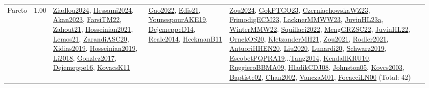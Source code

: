 {\begin{longtable}{p{3cm}r>{\raggedright\arraybackslash}p{6cm}>{\raggedright\arraybackslash}p{6cm}>{\raggedright\arraybackslash}p{8cm}}
\index{Pareto}\index{Concepts!Pareto}Pareto &  1.00 & \hyperref[detail:Ziadlou2024]{Ziadlou2024}, \hyperref[detail:Hessami2024]{Hessami2024}, \hyperref[detail:Akan2023]{Akan2023}, \hyperref[detail:FarsiTM22]{FarsiTM22}, \hyperref[detail:Zahout21]{Zahout21}, \hyperref[detail:Hosseinian2021]{Hosseinian2021}, \hyperref[detail:Lemos21]{Lemos21}, \hyperref[detail:ZarandiASC20]{ZarandiASC20}, \hyperref[detail:Xidias2019]{Xidias2019}, \hyperref[detail:Hosseinian2019]{Hosseinian2019}, \hyperref[detail:Li2018]{Li2018}, \hyperref[detail:Gonzlez2017]{Gonzlez2017}, \hyperref[detail:Dejemeppe16]{Dejemeppe16}, \hyperref[detail:KovacsK11]{KovacsK11} & \hyperref[detail:Gao2022]{Gao2022}, \hyperref[detail:Edis21]{Edis21}, \hyperref[detail:YounespourAKE19]{YounespourAKE19}, \hyperref[detail:DejemeppeD14]{DejemeppeD14}, \hyperref[detail:Reale2014]{Reale2014}, \hyperref[detail:HeckmanB11]{HeckmanB11} & \hyperref[detail:Zou2024]{Zou2024}, \hyperref[detail:GokPTGO23]{GokPTGO23}, \hyperref[detail:CzerniachowskaWZ23]{CzerniachowskaWZ23}, \hyperref[detail:FrimodigECM23]{FrimodigECM23}, \hyperref[detail:LacknerMMWW23]{LacknerMMWW23}, \hyperref[detail:JuvinHL23a]{JuvinHL23a}, \hyperref[detail:WinterMMW22]{WinterMMW22}, \hyperref[detail:Squillaci2022]{Squillaci2022}, \hyperref[detail:MengGRZSC22]{MengGRZSC22}, \hyperref[detail:JuvinHL22]{JuvinHL22}, \hyperref[detail:OrnekOS20]{OrnekOS20}, \hyperref[detail:KletzanderMH21]{KletzanderMH21}, \hyperref[detail:Zou2021]{Zou2021}, \hyperref[detail:Rodler2021]{Rodler2021}, \hyperref[detail:AntuoriHHEN20]{AntuoriHHEN20}, \hyperref[detail:Liu2020]{Liu2020}, \hyperref[detail:Lunardi20]{Lunardi20}, \hyperref[detail:Schwarz2019]{Schwarz2019}, \hyperref[detail:EscobetPQPRA19]{EscobetPQPRA19}...\hyperref[detail:Tang2014]{Tang2014}, \hyperref[detail:KendallKRU10]{KendallKRU10}, \hyperref[detail:RuggieroBBMA09]{RuggieroBBMA09}, \hyperref[detail:HladikCDJ08]{HladikCDJ08}, \hyperref[detail:Johnston05]{Johnston05}, \hyperref[detail:Kovcs2003]{Kovcs2003}, \hyperref[detail:Baptiste02]{Baptiste02}, \hyperref[detail:Chan2002]{Chan2002}, \hyperref[detail:VanczaM01]{VanczaM01}, \hyperref[detail:FocacciLN00]{FocacciLN00} (Total: 42)\\

\end{longtable}}
